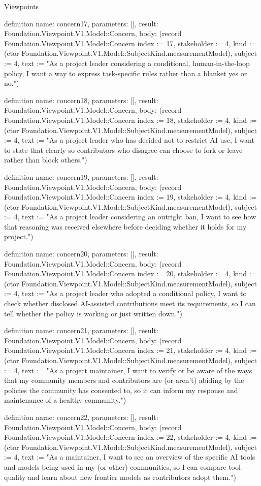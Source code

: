 \begin{lexlean}{Viewpoints}
\begin{semanticmodule}
definition{
  name: concern17,
  parameters: [],
  result: Foundation.Viewpoint.V1.Model::Concern,
  body: (record Foundation.Viewpoint.V1.Model::Concern {index := 17, stakeholder := 4, kind := (ctor Foundation.Viewpoint.V1.Model::SubjectKind.measurementModel), subject := 4, text := "As a project leader considering a conditional, human-in-the-loop policy, I want a way to express task-specific rules rather than a blanket yes or no."})
}

definition{
  name: concern18,
  parameters: [],
  result: Foundation.Viewpoint.V1.Model::Concern,
  body: (record Foundation.Viewpoint.V1.Model::Concern {index := 18, stakeholder := 4, kind := (ctor Foundation.Viewpoint.V1.Model::SubjectKind.measurementModel), subject := 4, text := "As a project leader who has decided not to restrict AI use, I want to state that clearly so contributors who disagree can choose to fork or leave rather than block others."})
}

definition{
  name: concern19,
  parameters: [],
  result: Foundation.Viewpoint.V1.Model::Concern,
  body: (record Foundation.Viewpoint.V1.Model::Concern {index := 19, stakeholder := 4, kind := (ctor Foundation.Viewpoint.V1.Model::SubjectKind.measurementModel), subject := 4, text := "As a project leader considering an outright ban, I want to see how that reasoning was received elsewhere before deciding whether it holds for my project."})
}

definition{
  name: concern20,
  parameters: [],
  result: Foundation.Viewpoint.V1.Model::Concern,
  body: (record Foundation.Viewpoint.V1.Model::Concern {index := 20, stakeholder := 4, kind := (ctor Foundation.Viewpoint.V1.Model::SubjectKind.measurementModel), subject := 4, text := "As a project leader who adopted a conditional policy, I want to check whether disclosed AI-assisted contributions meet its requirements, so I can tell whether the policy is working or just written down."})
}

definition{
  name: concern21,
  parameters: [],
  result: Foundation.Viewpoint.V1.Model::Concern,
  body: (record Foundation.Viewpoint.V1.Model::Concern {index := 21, stakeholder := 4, kind := (ctor Foundation.Viewpoint.V1.Model::SubjectKind.measurementModel), subject := 4, text := "As a project maintainer, I want to verify or be aware of the ways that my community members and contributors are (or aren't) abiding by the policies the community has consented to, so it can inform my response and maintenance of a healthy community."})
}

definition{
  name: concern22,
  parameters: [],
  result: Foundation.Viewpoint.V1.Model::Concern,
  body: (record Foundation.Viewpoint.V1.Model::Concern {index := 22, stakeholder := 4, kind := (ctor Foundation.Viewpoint.V1.Model::SubjectKind.measurementModel), subject := 4, text := "As a maintainer, I want to see an overview of the specific AI tools and models being used in my (or other) communities, so I can compare tool quality and learn about new frontier models as contributors adopt them."})
}


\end{semanticmodule}
\end{lexlean}
